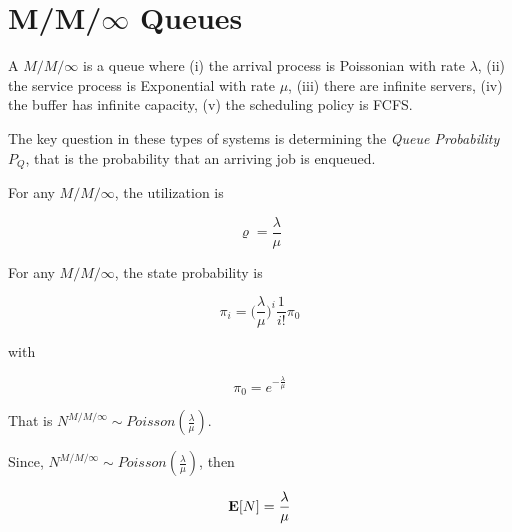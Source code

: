 \section{M/M/\texorpdfstring{$\infty$}{Infinity} Queues}
\label{sec:M-M-inf-Queues}

A $M/M/\infty$ is a queue where
(i) the arrival process is Poissonian with rate $\lambda$,
(ii) the service process is Exponential with rate $\mu$,
(iii) there are infinite servers,
(iv) the buffer has infinite capacity,
(v) the scheduling policy is FCFS.


The key question in these types of systems is determining the \textit{Queue Probability} $P_{Q}$, that is the probability that an arriving job is enqueued.

\begin{theorem}[Utilization]
	\label{thm:M-M-inf-Utilization}
	For any $M/M/\infty$, the utilization is
	
	\begin{equation}
	\label{eqn:M-M-inf-Utilization}
	\varrho = \frac{\lambda}{\mu}
	\end{equation}
\end{theorem}

\begin{theorem}
\label{thm:M-M-inf-Probability-State}
	For any $M/M/\infty$, the state probability is
	
	\begin{equation}
	\label{eqn:M-M-inf-Probability-State}
	\pi_{i} = \Big(\frac{\lambda}{\mu})^{i} \frac{1}{i!} \pi_{0}
	\end{equation}
	
	with
	
	\begin{equation}
	\label{eqn:M-M-inf-Probability-State-Zero}
	\pi_{0} = e^{-\frac{\lambda}{\mu}}
	\end{equation}
	
	That is $N^{M/M/\infty} \sim Poisson(\frac{\lambda}{\mu})$.
\end{theorem}

Since, $N^{M/M/\infty} \sim Poisson(\frac{\lambda}{\mu})$, then

\begin{equation}
\label{eqn:M-M-inf-Mean-System-Jobs}
\expected{N} = \frac{\lambda}{\mu}
\end{equation}


